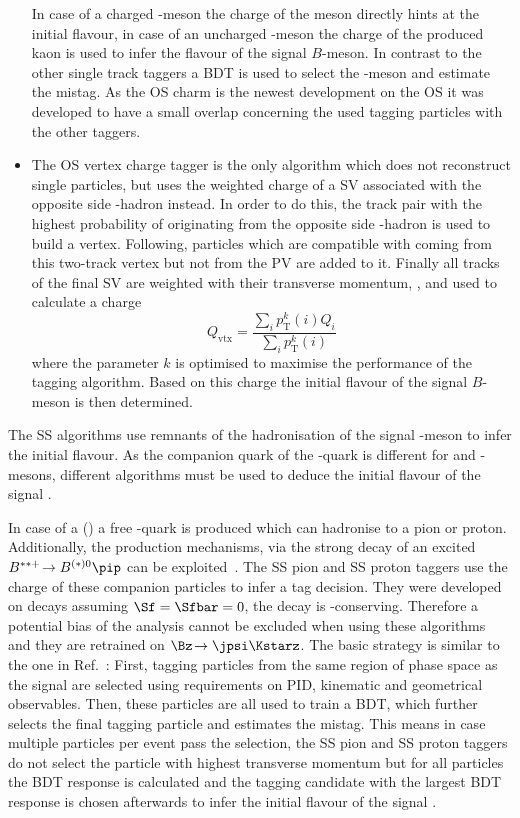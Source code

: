 \begin{itemize}
    In case of a charged \D-meson the charge of the meson directly hints at the initial flavour, in case of an uncharged \D-meson the charge of the produced kaon is used to infer the flavour of the signal $B$-meson.
    In contrast to the other single track taggers a \ac{BDT} is used to select the \D-meson and estimate the mistag.
    As the OS charm is the newest development on the OS it was developed to have a small overlap concerning the used tagging particles with the other taggers.
    \item The OS vertex charge tagger is the only algorithm which does not reconstruct single particles, but uses the weighted charge of a \ac{SV} associated with the opposite side \bquark-hadron instead.
    In order to do this, the track pair with the highest probability of originating from the opposite side \bquark-hadron is used to build a vertex.
    Following, particles which are compatible with coming from this two-track vertex but not from the \ac{PV} are added to it.
    Finally all tracks of the final \ac{SV} are weighted with their transverse momentum, \pt, and used to calculate a charge
    \begin{equation}
    Q_{\text{vtx}}=\frac{\sum_{i}p_{\mathrm T}^k(i)Q_i}{\sum_{i}p_{\mathrm T}^k(i)}
    \end{equation}
    where the parameter $k$ is optimised to maximise the performance of the tagging algorithm.
    Based on this charge the initial flavour of the signal $B$-meson is then determined.
\end{itemize}

The SS algorithms use remnants of the hadronisation of the signal \B-meson to infer the initial flavour.
As the companion quark of the \bquark-quark is different for \Bz and \Bs-mesons, different algorithms must be used to deduce the initial flavour of the signal \B.

In case of a \Bz (\bquarkbar\dquark) a free \dquarkbar-quark is produced which can hadronise to a pion or proton.
Additionally, the production mechanisms, \eg via the strong decay of an excited $B^{**+}\!\to B^{(*)0}\pip$ can be exploited~\cite{Aaij:2016rdg}.
The SS pion and SS proton taggers use the charge of these companion particles to infer a tag decision.
They were developed on \BdToDpi decays assuming $\Sf=\Sfbar=0$, \ie the decay \BdToDpi is \CP-conserving.
Therefore a potential bias of the analysis cannot be excluded when using these algorithms and they are retrained on $\Bz\!\to\jpsi\Kstarz$.
The basic strategy is similar to the one in Ref.~\cite{Aaij:2016rdg}:
First, tagging particles from the same region of phase space as the signal \B are selected using requirements on PID, kinematic and geometrical observables.
Then, these particles are all used to train a \ac{BDT}, which further selects the final tagging particle and estimates the mistag.
This means in case multiple particles per event pass the selection, the SS pion and SS proton taggers do not select the particle with highest transverse momentum but for all particles the \ac{BDT} response is calculated and the tagging candidate with the largest \ac{BDT} response is chosen afterwards to infer the initial flavour of the signal \B.

